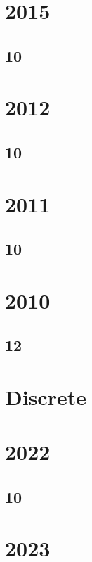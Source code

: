\section{2015}
\subsection{10}


\section{2012}
\subsection{10}

%
%
%
\section{2011}
\subsection{10}


\section{2010}
\subsection{12}


\section{Discrete}
\section{2022}
\subsection{10}

\section{2023}
